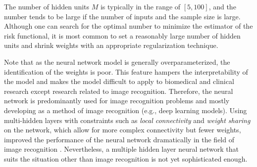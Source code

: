 \documentclass[12pt]{article}
\begin{document}
The number of hidden units $M$ is typically in the range of $[5,100]$, and the number tends to be large if the number of inputs and the sample size is large. Although one can search for the optimal number to minimize the estimator of the risk functional, it is most common to set a reasonably large number of hidden units and shrink weights with an appropriate regularization technique.

Note that as the neural network model is generally overparameterized, the identification of the weights is poor. This feature hampers the interpretability of the model and makes the model difficult to apply to biomedical and clinical research except research related to image recognition. Therefore, the neural network is predominantly used for image recognition problems and mostly developing as a method of image recognition (e.g., deep learning models). Using multi-hidden layers with constraints such as {\it  local connectivity} and {\it weight sharing} on the network, which allow for more complex connectivity but fewer weights, improved the performance of the neural network dramatically in the field of image recognition \parencite{Lecun1989,Lecun1998}. Nevertheless, a multiple hidden layer neural network that suits the situation other than image recognition is not yet sophisticated enough.

\clearpage

\printbibliography
\end{document}
